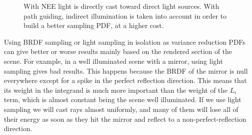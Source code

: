 \documentclass{PoliMi_MasterThesis}
\begin{document}
\begin{figure}[H]
    \centering
	\qquad
	\caption{With NEE light is directly cast toward direct light sources. With path guiding, indirect illumination is taken into account in order to build a better sampling PDF, at a higher cost.}
    \label{fig:nee_and _path_guiding}
\end{figure}

Using BRDF sampling or light sampling in isolation as variance reduction PDFs can give better or worse results mainly based on the rendered section of the scene. For example, in a well illuminated scene with a mirror, using light sampling gives bad results. This happens because the BRDF of the mirror is null everywhere except for a spike in the perfect reflection direction. This means that its weight in the integrand is much more important than the weight of the $L_i$ term, which is almost constant being the scene well illuminated. If we use light sampling we will cast rays almost uniformly, and many of them will lose all of their energy as soon as they hit the mirror and reflect to a non-perfect-reflection direction.
\end{document}
